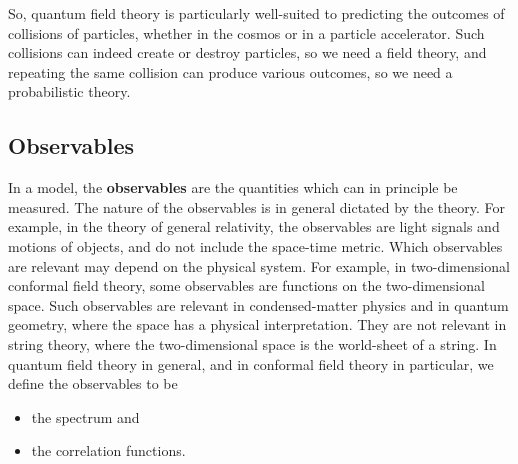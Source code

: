 \documentclass[12pt,a4paper,notitlepage]{report}
\numberwithin{equation}{section}
\theoremstyle{break}
\begin{document}
So, quantum field theory is particularly well-suited to predicting the outcomes of collisions of particles, whether in the cosmos or in a particle accelerator.
Such collisions can indeed create or destroy particles, so we need a field theory, and repeating the same collision can produce various outcomes, so we need a probabilistic theory. 

\subsection{Observables}

In a model, the \textbf{\boldmath observables} are the quantities which can in principle be measured.
The nature of the observables is in general dictated by the theory.
For example, in the theory of general relativity, the observables are light signals and motions of objects, and do not include the space-time metric. 
Which observables are relevant may depend on the physical system.
For example, in two-dimensional conformal field theory, some observables are functions on the two-dimensional space.
Such observables are relevant in condensed-matter physics and in quantum geometry, where the space has a physical interpretation.
They are not relevant in string theory, where the two-dimensional space is the world-sheet of a string. 
In quantum field theory in general, and in conformal field theory in particular, we define the observables to be 
\begin{itemize}
 \item the spectrum and
\item the correlation functions.
\end{itemize}
\end{document}
